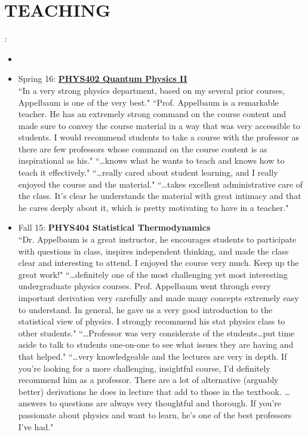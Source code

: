 \documentclass[paper=letter,fontsize=11pt]{scrartcl} %
\newcommand{\NewPart}[2]{\section*{\uppercase{#1} #2}}
\newcommand{\CourseEntry}[3]{
		\noindent \item{#1: \textbf{#2} \\ #3}}
\begin{document}
\NewPart{Teaching}{}
\textit{:}
\begin{itemize}
\item[]
\vspace{-24pt}

\CourseEntry{Spring 16}{\href{http://www.lulu.com/content/paperback-book/quantum-physics/14892135}{PHYS402 Quantum Physics II}}{``In a very strong physics department, based on my several prior courses, Appelbaum is one of the very best." ``Prof. Appelbaum is a remarkable teacher. He has an extremely strong command on the course content and made sure to convey the course material in a way that was very accessible to students. I would recommend students to take a course with the professor as there are few professors whose command on the course content is as inspirational as his." ``\dots knows what he wants to teach and knows how to teach it effectively." ``\dots really cared about student learning, and I really enjoyed the course and the material." ``\dots takes excellent administrative care of the class. It's clear he understands the material with great intimacy and that he cares deeply about it, which is pretty motivating to
have in a teacher."}

\CourseEntry{Fall 15}{PHYS404 Statistical Thermodynamics}{``Dr. Appelbaum is a great instructor, he encourages students to participate with questions in class, inspires independent thinking, and made the class clear and interesting to attend. I enjoyed the course very much. Keep up the great work!" ``\ldots definitely one of the most challenging yet most interesting undergraduate physics courses. Prof. Appelbaum went through every important derivation very carefully and made many concepts extremely easy to understand. In general, he gave us a very good introduction to the statistical view of physics. I strongly recommend his stat physics class to other students." ``\ldots Professor was very considerate of the students\dots put time aside to talk to students one-on-one to see what issues they are having and that helped." ``\ldots very knowledgeable and the lectures are very in depth. If you're looking for a more challenging, insightful course, I'd definitely recommend him as a professor. There are a lot of alternative (arguably better) derivations he does in lecture that add to those in the textbook. \dots answers to questions are always very thoughtful and thorough. If you're passionate about physics and want to learn, he's one of the best professors I've had." }


\end{itemize}
\end{document}
